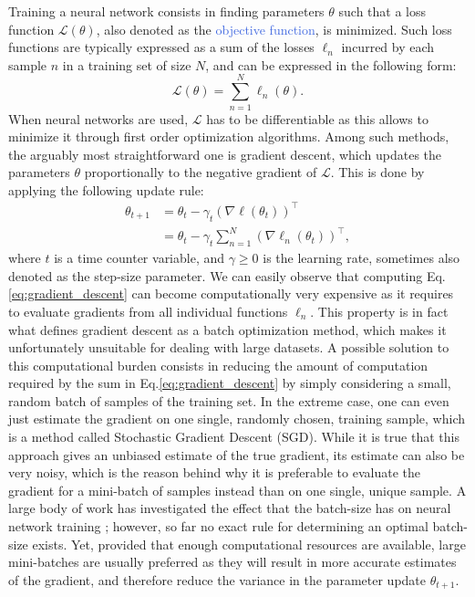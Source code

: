 Training a neural network consists in finding parameters $\theta$ such that a loss function $\mathscr{L}(\theta)$, also denoted as the \textcolor{RoyalBlue}{objective function}, is minimized. Such loss functions are typically expressed as a sum of the losses $\ell_n$ incurred by each sample $n$ in a training set of size $N$, and can be expressed in the following form:
\begin{equation}
	\mathscr{L}(\theta) = \sum_{n=1}^{N}\ell_n(\theta).
	\label{eq:sum_of_losses}
\end{equation}
When neural networks are used, $\mathscr{L}$ has to be differentiable as this allows to minimize it through first order optimization algorithms. Among such methods, the arguably most straightforward one is gradient descent, which updates the parameters $\theta$ proportionally to the negative gradient of $\mathscr{L}$. This is done by applying the following update rule:
\begin{align}
	\theta_{t+1} & = \theta_t - \gamma_t(\nabla\ell(\theta_t))^{\intercal} \\ 
	& = \theta_t - \gamma_t \sum_{n=1}^{N}(\nabla \ell_n(\theta_t))^{\intercal},
	\label{eq:gradient_descent}
\end{align}
where $t$ is a time counter variable, and $\gamma\geq0$ is the learning rate, sometimes also denoted as the step-size parameter. We can easily observe that computing Eq. \ref{eq:gradient_descent} can become computationally very expensive as it requires to evaluate gradients from all individual functions $\ell_n$. This property is in fact what defines gradient descent as a batch optimization method, which makes it unfortunately unsuitable for dealing with large datasets. A possible solution to this computational burden consists in reducing the amount of computation required by the sum in Eq.\ref{eq:gradient_descent} by simply considering a small, random batch of samples of the training set. In the extreme case, one can even just estimate the gradient on one single, randomly chosen, training sample, which is a method called Stochastic Gradient Descent (SGD). While it is true that this approach gives an unbiased estimate of the true gradient, its estimate can also be very noisy, which is the reason behind why it is preferable to evaluate the gradient for a mini-batch of samples instead than on one single, unique sample. A large body of work has investigated the effect that the batch-size has on neural network training \cite{keskar2016large,radiuk2017impact,kandel2020effect}; however, so far no exact rule for determining an optimal batch-size exists. Yet, provided that enough computational resources are available, large mini-batches are usually preferred as they will result in more accurate estimates of the gradient, and therefore reduce the variance in the parameter update $\theta_{t+1}$. 

